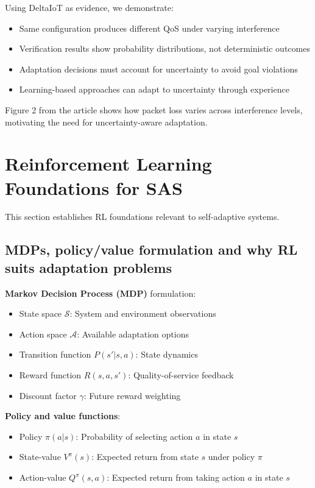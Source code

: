 \documentclass[11pt,a4paper]{article}
\begin{document}
Using DeltaIoT as evidence, we demonstrate:

\begin{itemize}
    \item Same configuration produces different QoS under varying interference
    \item Verification results show probability distributions, not deterministic outcomes
    \item Adaptation decisions must account for uncertainty to avoid goal violations
    \item Learning-based approaches can adapt to uncertainty through experience
\end{itemize}

Figure 2 from the article shows how packet loss varies across interference levels, motivating the need for uncertainty-aware adaptation.

\section{Reinforcement Learning Foundations for SAS}

This section establishes RL foundations relevant to self-adaptive systems.

\subsection{MDPs, policy/value formulation and why RL suits adaptation problems}

\textbf{Markov Decision Process (MDP)} formulation:
\begin{itemize}
    \item State space $\mathcal{S}$: System and environment observations
    \item Action space $\mathcal{A}$: Available adaptation options
    \item Transition function $P(s'|s,a)$: State dynamics
    \item Reward function $R(s,a,s')$: Quality-of-service feedback
    \item Discount factor $\gamma$: Future reward weighting
\end{itemize}

\textbf{Policy and value functions}:
\begin{itemize}
    \item Policy $\pi(a|s)$: Probability of selecting action $a$ in state $s$
    \item State-value $V^\pi(s)$: Expected return from state $s$ under policy $\pi$
    \item Action-value $Q^\pi(s,a)$: Expected return from taking action $a$ in state $s$
\end{itemize}
\end{document}
